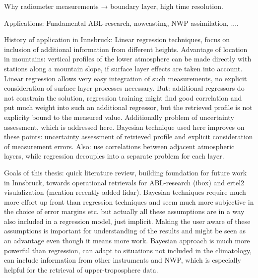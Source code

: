 Why radiometer measurements → boundary layer, high time resolution.

Applications: Fundamental ABL-research, nowcasting, NWP assimilation, ....

History of application in Innsbruck: Linear regression techniques, focus on
inclusion of additional information from different heights. Advantage of
location in mountains: vertical profiles of the lower atmosphere can be made
directly with stations along a mountain slope, if surface layer effects are
taken into account. Linear regression allows very easy integration of such
measurements, no explicit consideration of surface layer processes necessary.
But: additional regressors do not constrain the solution, regression training
might find good correlation and put much weight into such an additional
regressor, but the retrieved profile is not explicity bound to the measured
value. Additionally problem of uncertainty assessment, which is addressed here.
Bayesian technique used here improves on these points: uncertainty assessment
of retrieved profile and explicit consideration of measurement errors. Also:
use correlations between adjacent atmospheric layers, while regression
decouples into a separate problem for each layer.

Goals of this thesis: quick literature review, building foundation for future
work in Innsbruck, towards operational retrievals for ABL-research (ibox) and
ertel2 visulalization (mention recently added lidar). Bayesian techniques
require much more effort up front than regression techniques and seem much more
subjective in the choice of error margins etc. but actually all these
assumptions are in a way also included in a regression model, just implicit.
Making the user aware of these assumptions is important for understanding of
the results and might be seen as an advantage even though it means more work.
Bayesian approach is much more powerful than regression, can adapt to
situations not included in the climatology, can include information from other
instruments and NWP, which is especially helpful for the retrieval of
upper-troposphere data.

